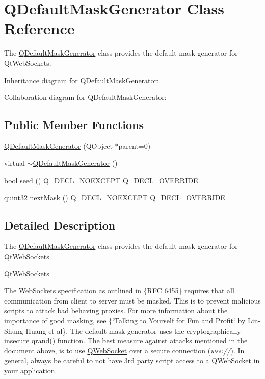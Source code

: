 \hypertarget{class_q_default_mask_generator}{}\section{Q\+Default\+Mask\+Generator Class Reference}
\label{class_q_default_mask_generator}


The \mbox{\hyperlink{class_q_default_mask_generator}{Q\+Default\+Mask\+Generator}} class provides the default mask generator for Qt\+Web\+Sockets.  




Inheritance diagram for Q\+Default\+Mask\+Generator\+:


Collaboration diagram for Q\+Default\+Mask\+Generator\+:
\subsection*{Public Member Functions}
\begin{DoxyCompactItemize}
\item 
\mbox{\hyperlink{class_q_default_mask_generator_a4afe892077be5d2745b9ff857e785b01}{Q\+Default\+Mask\+Generator}} (Q\+Object $\ast$parent=0)
\item 
virtual \mbox{\hyperlink{class_q_default_mask_generator_a36579ef5257207e7ba9ac90360bb4c56}{$\sim$\+Q\+Default\+Mask\+Generator}} ()
\item 
bool \mbox{\hyperlink{class_q_default_mask_generator_a0ee0187ffa93deb9e30d96f4c560a48d}{seed}} () Q\+\_\+\+D\+E\+C\+L\+\_\+\+N\+O\+E\+X\+C\+E\+PT Q\+\_\+\+D\+E\+C\+L\+\_\+\+O\+V\+E\+R\+R\+I\+DE
\item 
quint32 \mbox{\hyperlink{class_q_default_mask_generator_a1dde10b93e9e5c484cf15cfced080226}{next\+Mask}} () Q\+\_\+\+D\+E\+C\+L\+\_\+\+N\+O\+E\+X\+C\+E\+PT Q\+\_\+\+D\+E\+C\+L\+\_\+\+O\+V\+E\+R\+R\+I\+DE
\end{DoxyCompactItemize}


\subsection{Detailed Description}
The \mbox{\hyperlink{class_q_default_mask_generator}{Q\+Default\+Mask\+Generator}} class provides the default mask generator for Qt\+Web\+Sockets. 

Qt\+Web\+Sockets

The Web\+Sockets specification as outlined in  \{R\+FC 6455\} requires that all communication from client to server must be masked. This is to prevent malicious scripts to attack bad behaving proxies. For more information about the importance of good masking, see  \{\char`\"{}\+Talking to Yourself for Fun and Profit\char`\"{} by Lin-\/\+Shung Huang et al\}. The default mask generator uses the cryptographically insecure qrand() function. The best measure against attacks mentioned in the document above, is to use \mbox{\hyperlink{class_q_web_socket}{Q\+Web\+Socket}} over a secure connection ({\itshape wss\+://}). In general, always be careful to not have 3rd party script access to a \mbox{\hyperlink{class_q_web_socket}{Q\+Web\+Socket}} in your application. 

